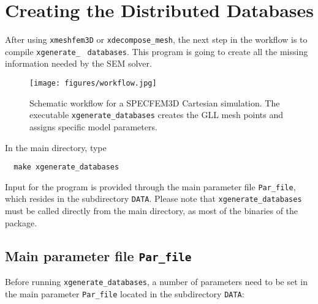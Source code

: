 \chapter{Creating the Distributed Databases}\label{cha:Creating-Distributed-Databases}

After using \texttt{xmeshfem3D} or \texttt{xdecompose\_mesh}, the
next step in the workflow is to compile \texttt{xgenerate\_}~\newline
 \texttt{databases}. This program is going to create all the missing
information needed by the SEM solver.

\begin{figure}[htbp]
\begin{centering}
\texttt{[image: figures/workflow.jpg]}
\par
\end{centering}
\caption{Schematic workflow for a SPECFEM3D Cartesian simulation. The executable
\texttt{xgenerate\_databases} creates the GLL mesh points and assigns
specific model parameters.}
\label{fig:workflow.databases}
\end{figure}

\noindent
In the main directory, type
{\small
\begin{verbatim}
  make xgenerate_databases
\end{verbatim}
}
\noindent
Input for the program is provided through the main parameter file
\texttt{Par\_file}, which resides in the subdirectory \texttt{DATA}.
Please note that \texttt{xgenerate\_databases} must be called directly
from the main directory, as most of the binaries of the package.

\newpage
\section{Main parameter file \texttt{Par\_file}}\label{cha:Main-Parameter}

Before running \texttt{xgenerate\_databases}, a number of parameters
need to be set in the main parameter \texttt{Par\_file} located in
the subdirectory \texttt{DATA}:\newline

